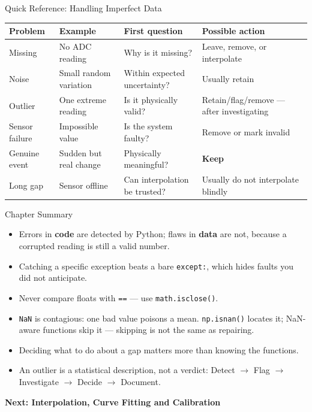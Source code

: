 \documentclass[9pt,aspectratio=169,xcolor=table]{beamer}
\newcommand{\striped}{\rowcolors{1}{white}{stripe}}
\begin{document}
\begin{frame}{Quick Reference: Handling Imperfect Data}
    \leavevmode
    \small
    \striped
    \begin{center}
    \scriptsize
    \begin{tabular}{@{}p{1.8cm}p{2.6cm}p{3.0cm}p{3.6cm}@{}}
    \toprule
    \textbf{Problem} & \textbf{Example} & \textbf{First question} & \textbf{Possible action} \\
    \midrule
    Missing & No ADC reading & Why is it missing? & Leave, remove, or interpolate \\
    Noise & Small random variation & Within expected uncertainty? & Usually retain \\
    Outlier & One extreme reading & Is it physically valid? & Retain/flag/remove --- after investigating \\
    Sensor failure & Impossible value & Is the system faulty? & Remove or mark invalid \\
    Genuine event & Sudden but real change & Physically meaningful? & \textbf{Keep} \\
    Long gap & Sensor offline & Can interpolation be trusted? & Usually do not interpolate blindly \\
    \bottomrule
    \end{tabular}
    \end{center}
\end{frame}

\begin{frame}{Chapter Summary}
    \leavevmode
    \small
    \begin{itemize}
        \item Errors in \textbf{code} are detected by Python; flaws in
              \textbf{data} are not, because a corrupted reading is
              still a valid number.
        \item Catching a \alert{specific} exception beats a bare
              \texttt{except:}, which hides faults you did not
              anticipate.
        \item Never compare floats with \texttt{==} --- use
              \texttt{math.isclose()}.
        \item \texttt{NaN} is contagious: one bad value poisons a mean.
              \texttt{np.isnan()} locates it; NaN-aware functions skip
              it --- skipping is not the same as repairing.
        \item Deciding \alert{what} to do about a gap matters more than
              knowing the functions.
        \item An outlier is a statistical description, not a verdict:
              \alert{Detect $\to$ Flag $\to$ Investigate $\to$ Decide
              $\to$ Document}.
    \end{itemize}

    \vspace{3mm}
    \begin{center}
        \large\color{primary}\textbf{Next: Interpolation, Curve Fitting
        and Calibration}
    \end{center}
\end{frame}
\end{document}
